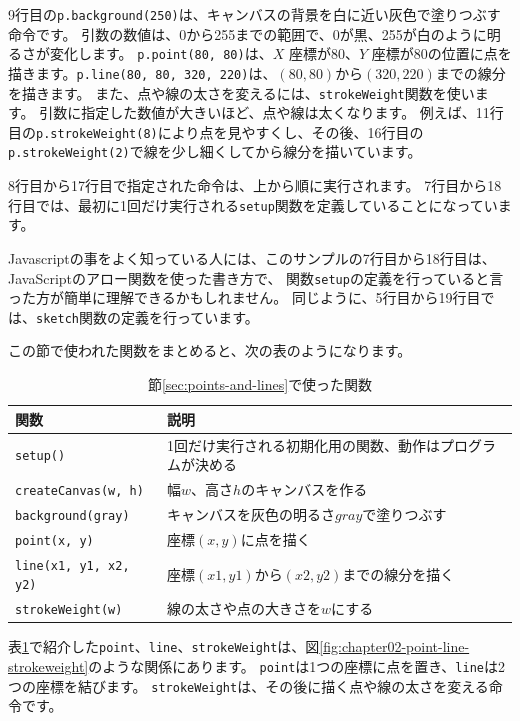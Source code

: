 9行目の\texttt{p.background(250)}は、キャンバスの背景を白に近い灰色で塗りつぶす命令です。
引数の数値は、0から255までの範囲で、0が黒、255が白のように明るさが変化します。
\texttt{p.point(80, 80)}は、$X$ 座標が80、$Y$ 座標が80の位置に点を描きます。\texttt{p.line(80, 80, 320, 220)}は、$(80, 80)$から$(320, 220)$までの線分を描きます。
また、点や線の太さを変えるには、\texttt{strokeWeight}関数を使います。
引数に指定した数値が大きいほど、点や線は太くなります。
例えば、11行目の\texttt{p.strokeWeight(8)}により点を見やすくし、その後、16行目の\texttt{p.strokeWeight(2)}で線を少し細くしてから線分を描いています。

8行目から17行目で指定された命令は、上から順に実行されます。
7行目から18行目では、最初に1回だけ実行される\texttt{setup}関数を定義していることになっています。

Javascriptの事をよく知っている人には、このサンプルの7行目から18行目は、JavaScriptのアロー関数を使った書き方で、
関数\texttt{setup}の定義を行っていると言った方が簡単に理解できるかもしれません。
同じように、5行目から19行目では、\texttt{sketch}関数の定義を行っています。

この節で使われた関数をまとめると、次の表のようになります。

\begin{table}[htbp]
\centering
\begin{tabular}{ll}
\toprule
関数 & 説明 \\
\midrule
\texttt{setup()} & 1回だけ実行される初期化用の関数、動作はプログラムが決める \\
\texttt{createCanvas(w, h)} & 幅$w$、高さ$h$のキャンバスを作る \\
\texttt{background(gray)} & キャンバスを灰色の明るさ$gray$で塗りつぶす \\
\texttt{point(x, y)} & 座標$(x, y)$に点を描く \\
\texttt{line(x1, y1, x2, y2)} & 座標$(x1, y1)$から$(x2, y2)$までの線分を描く \\
\texttt{strokeWeight(w)} & 線の太さや点の大きさを$w$にする \\
\bottomrule
\end{tabular}
\caption{節\ref{sec:points-and-lines}で使った関数}
\label{tab:chapter02-points-and-lines}
\end{table}

表\ref{tab:chapter02-points-and-lines}で紹介した\texttt{point}、\texttt{line}、\texttt{strokeWeight}は、図\ref{fig:chapter02-point-line-strokeweight}のような関係にあります。
\texttt{point}は1つの座標に点を置き、\texttt{line}は2つの座標を結びます。
\texttt{strokeWeight}は、その後に描く点や線の太さを変える命令です。

